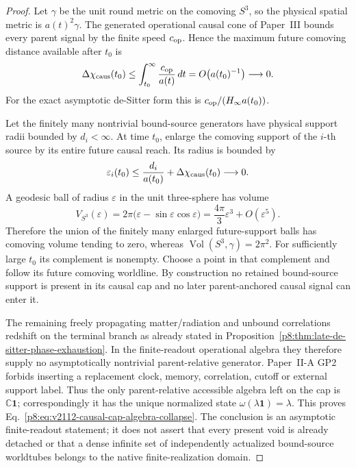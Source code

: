 \documentclass[12pt,a4paper]{article}
\begin{document}
\begin{proof}
Let \(\gamma\) be the unit round metric on the comoving \(S^3\), so the
physical spatial metric is \(a(t)^2\gamma\).  The generated operational causal
cone of Paper~III bounds every parent signal by the finite speed
\(c_{\rm op}\).  Hence the maximum future comoving distance available after
\(t_0\) is
\begin{equation}
\label{p8:eq:v2112-future-comoving-reach}
 \Delta\chi_{\rm caus}(t_0)
 \le
 \int_{t_0}^{\infty}\frac{c_{\rm op}}{a(t)}\,dt
 =O\!\left(a(t_0)^{-1}\right)
 \longrightarrow0.
\end{equation}
For the exact asymptotic de-Sitter form this is
\(c_{\rm op}/(H_\infty a(t_0))\).

Let the finitely many nontrivial bound-source generators have physical support
radii bounded by \(d_i<\infty\).  At time \(t_0\), enlarge the comoving support
of the \(i\)-th source by its entire future causal reach.  Its radius is bounded
by
\[
 \varepsilon_i(t_0)
 \le \frac{d_i}{a(t_0)}+\Delta\chi_{\rm caus}(t_0)
 \longrightarrow0.
\]
A geodesic ball of radius \(\varepsilon\) in the unit three-sphere has volume
\[
 V_{S^3}(\varepsilon)
 =2\pi\bigl(\varepsilon-\sin\varepsilon\cos\varepsilon\bigr)
 =\frac{4\pi}{3}\varepsilon^3+O(\varepsilon^5).
\]
Therefore the union of the finitely many enlarged future-support balls has
comoving volume tending to zero, whereas
\(\operatorname{Vol}(S^3,\gamma)=2\pi^2\).  For sufficiently large \(t_0\)
its complement is nonempty.  Choose a point in that complement and follow its
future comoving worldline.  By construction no retained bound-source support
is present in its causal cap and no later parent-anchored causal signal can
enter it.

The remaining freely propagating matter/radiation and unbound correlations
redshift on the terminal branch as already stated in
Proposition~\ref{p8:thm:late-de-sitter-phase-exhaustion}.  In the finite-readout
operational algebra they therefore supply no asymptotically nontrivial
parent-relative generator.  Paper~II-A GP2 forbids inserting a replacement
clock, memory, correlation, cutoff or external support label.  Thus the only parent-relative accessible algebra left on the cap is
\(\mathbb C\mathbf1\); correspondingly it has the unique normalized state
\(\omega(\lambda\mathbf1)=\lambda\).  This proves
Eq.~\eqref{p8:eq:v2112-causal-cap-algebra-collapse}.  The conclusion is an
asymptotic finite-readout statement; it does not assert that every present void
is already detached or that a dense infinite set of independently actualized
bound-source worldtubes belongs to the native finite-realization domain.
\end{proof}
\end{document}
